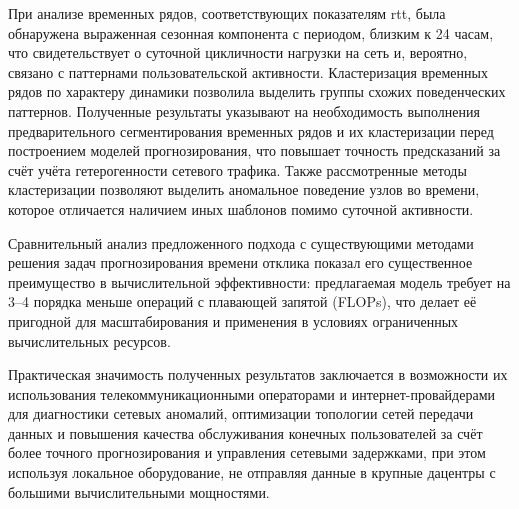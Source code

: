 При анализе временных рядов, соответствующих показателям rtt, была обнаружена выраженная сезонная компонента с периодом, близким к 24 часам, что свидетельствует о суточной цикличности нагрузки на сеть и, вероятно, связано с паттернами пользовательской активности. Кластеризация временных рядов по характеру динамики позволила выделить группы схожих поведенческих паттернов. Полученные результаты указывают на необходимость выполнения предварительного сегментирования временных рядов и их кластеризации перед построением моделей прогнозирования, что повышает точность предсказаний за счёт учёта гетерогенности сетевого трафика. Также рассмотренные методы кластеризации позволяют выделить аномальное поведение узлов во времени, которое отличается наличием иных шаблонов помимо суточной активности. 

Сравнительный анализ предложенного подхода с существующими методами решения задач прогнозирования времени отклика показал его существенное преимущество в вычислительной эффективности: предлагаемая модель требует на 3–4 порядка меньше операций с плавающей запятой (FLOPs), что делает её пригодной для масштабирования и применения в условиях ограниченных вычислительных ресурсов.

Практическая значимость полученных результатов заключается в возможности их использования телекоммуникационными операторами и интернет-провайдерами для диагностики сетевых аномалий, оптимизации топологии сетей передачи данных и повышения качества обслуживания конечных пользователей за счёт более точного прогнозирования и управления сетевыми задержками, при этом используя локальное оборудование, не отправляя данные в крупные дацентры с большими вычислительными мощностями.


\clearpage

